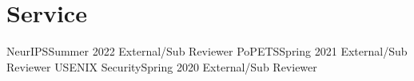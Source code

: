 \section{Service}
  \CVSubHeadingListStart
    \CVSubheading
      {NeurIPS}{Summer 2022}
      {External/Sub Reviewer}{}
    \CVSubheading
      {PoPETS}{Spring 2021}
      {External/Sub Reviewer}{}
    \CVSubheading
      {USENIX Security}{Spring 2020}
      {External/Sub Reviewer}{}
  \CVSubHeadingListEnd